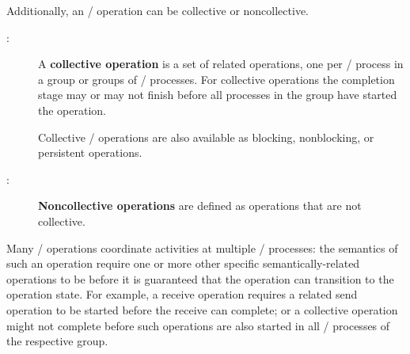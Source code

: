 \medskip %

Additionally, an \MPI/ operation can be collective or noncollective.

\begin{description}
\item[:]
A \textbf{collective operation} is a set of related operations, one per \MPI/ process in a group
or groups of \MPI/ processes. For collective operations the completion
stage may or may not finish before all processes in the group have
started the operation.

Collective \MPI/ operations are also available as blocking, nonblocking, or persistent operations.

\item[:]
\textbf{Noncollective operations} are defined as operations that are not collective.
\end{description}


Many \MPI/ operations coordinate activities at multiple \MPI/ processes:
the semantics of such an operation require one or more other specific semantically-related operations to be 
before it is guaranteed that the operation can transition to the  operation state.
For example, a receive operation requires a related send operation to be started before the receive can complete;
or a collective operation might not complete before such operations are also started in all \MPI/ processes of the respective group.

